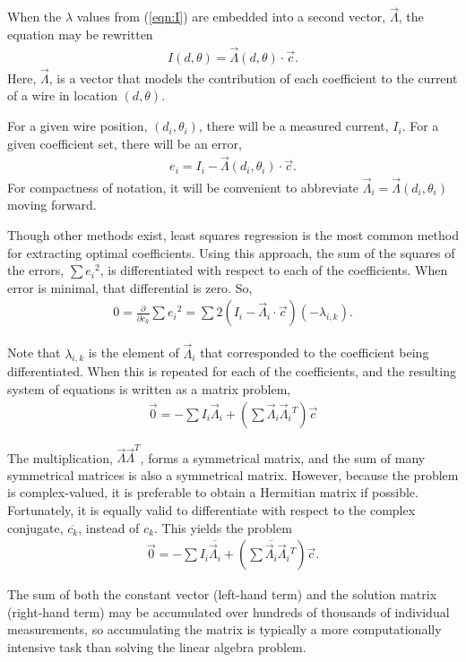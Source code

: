 \documentclass{article}
\begin{document}
When the $\lambda$ values from (\ref{eqn:I}) are embedded into a second vector, $\vec{\Lambda}$, the equation may be rewritten
\begin{align}
I(d,\theta) = \vec{\Lambda}(d,\theta) \cdot \vec{c}.
\end{align}
Here, $\vec{\Lambda}$, is a vector that models the contribution of each coefficient to the current of a wire in location $(d,\theta)$.

For a given wire position, $(d_i, \theta_i)$, there will be a measured current, $I_i$.  For a given coefficient set, there will be an error,
\begin{align}
e_i = I_i - \vec{\Lambda}(d_i, \theta_i) \cdot \vec{c}.
\end{align}
For compactness of notation, it will be convenient to abbreviate $\vec{\Lambda}_i = \vec{\Lambda}(d_i, \theta_i)$ moving forward.  

Though other methods exist, least squares regression is the most common method for extracting optimal coefficients.  Using this approach, the sum of the squares of the errors, $\sum e_i{^2}$, is differentiated with respect to each of the coefficients.  When error is minimal, that differential is zero.  So,
\begin{align}
0 = \frac{\partial}{\partial c_k} \sum e_i {^2} = \sum 2\left(I_i - \vec{\Lambda}_i \cdot \vec{c}\right)\left(- \lambda_{i,k}\right).
\end{align}

Note that $\lambda_{i,k}$ is the element of $\vec{\Lambda}_i$ that corresponded to the coefficient being differentiated.  When this is repeated for each of the coefficients, and the resulting system of equations is written as a matrix problem,
\begin{align}
\vec{0} = -\sum I_i \vec{\Lambda}_i + \left(\sum \vec{\Lambda}_i \vec{\Lambda}_i{^T} \right) \vec{c}
\end{align}

The multiplication, $\vec{\Lambda} \vec{\Lambda}^T$, forms a symmetrical matrix, and the sum of many symmetrical matrices is also a symmetrical matrix.  However, because the problem is complex-valued, it is preferable to obtain a Hermitian matrix if possible.  Fortunately, it is equally valid to differentiate with respect to the complex conjugate, $\overline{c_k}$, instead of $c_k$.  This yields the problem
\begin{align}
\vec{0} = -\sum I_i \overline{\vec{\Lambda}_i}  + \left(\sum \overline{\vec{\Lambda}_i} \vec{\Lambda}_i{^T} \right) \vec{c}.
\end{align}

The sum of both the constant vector (left-hand term) and the solution matrix (right-hand term) may be accumulated over hundreds of thousands of individual measurements, so accumulating the matrix is typically a more computationally intensive task than solving the linear algebra problem.
\end{document}
